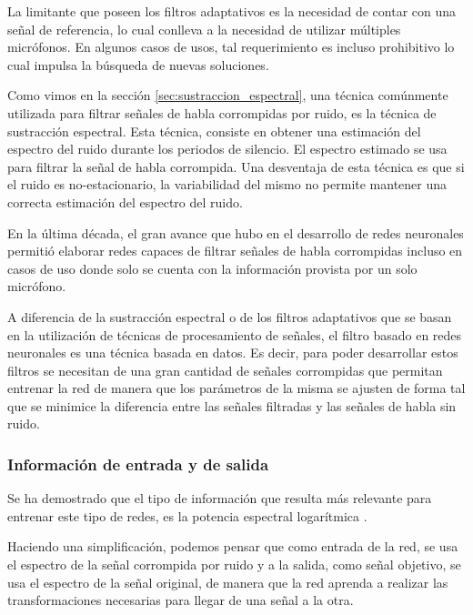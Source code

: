 La limitante que poseen los filtros adaptativos es la necesidad de contar con una señal de referencia, lo cual conlleva a la necesidad de utilizar múltiples micrófonos. En algunos casos de usos, tal requerimiento es incluso prohibitivo lo cual impulsa la búsqueda de nuevas soluciones. 

Como vimos en la sección \ref{sec:sustraccion_espectral}, una técnica comúnmente utilizada para filtrar señales de habla corrompidas por ruido, es la técnica de sustracción espectral. Esta técnica, consiste en obtener una estimación del espectro del ruido durante los periodos de silencio. El espectro estimado se usa para filtrar la señal de habla corrompida. Una desventaja de esta técnica es que si el ruido es no-estacionario, la variabilidad del mismo no permite mantener una correcta estimación del espectro del ruido.

En la última década, el gran avance que hubo en el desarrollo de redes neuronales \cite{deep_learning} permitió elaborar redes capaces de filtrar señales de habla corrompidas incluso en casos de uso donde solo se cuenta con la información provista por un solo micrófono. 

A diferencia de la sustracción espectral o de los filtros adaptativos que se basan en la utilización de técnicas de procesamiento de señales, el filtro basado en redes neuronales es una técnica basada en datos. Es decir, para poder desarrollar estos filtros se necesitan de una gran cantidad de señales corrompidas que permitan entrenar la red de manera que los parámetros de la misma se ajusten de forma tal que se minimice la diferencia entre las señales filtradas y las señales de habla sin ruido.

\subsubsection{Información de entrada y de salida}

Se ha demostrado que el tipo de información que resulta más relevante para entrenar este tipo de redes, es la potencia espectral logarítmica \cite{a_regression_approach_to_speech_enhancement_based_on_deep_neural_networks}. 

Haciendo una simplificación, podemos pensar que como entrada de la red, se usa el espectro de la señal corrompida por ruido y a la salida, como señal objetivo, se usa el espectro de la señal original, de manera que la red aprenda a realizar las transformaciones necesarias para llegar de una señal a la otra.

